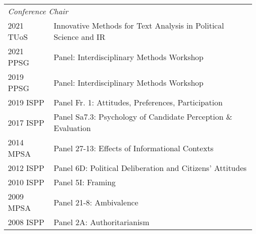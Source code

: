 \documentclass[12pt]{article}
\begin{document}
\begin{longtable}{@{}p{3.5cm}@{}l}%
    \multicolumn{2}{l}{\textit{Conference Chair}}\\

			2021 TUoS & Innovative Methods for Text Analysis in Political Science and IR\\    
    
			2021 PPSG & {Panel: Interdisciplinary Methods Workshop}\\  
			
			 2019 PPSG & {Panel: Interdisciplinary Methods Workshop}\\  
    		
			2019 ISPP & {Panel Fr. 1: Attitudes, Preferences, Participation}\\            
            
            2017 ISPP & {Panel Sa7.3: Psychology of Candidate 
            Perception \& Evaluation}\\    
    
            2014 MPSA & {Panel 27-13: Effects 
            of Informational Contexts}\\
            
            2012 ISPP & {Panel 6D: Political 
            Deliberation and Citizens' Attitudes}\\
            
            2010 ISPP & {Panel 5I: Framing}\\
            
            2009 MPSA & {Panel 21-8: Ambivalence}\\
            
            2008 ISPP & {Panel 2A: Authoritarianism}\\
\end{longtable}
\end{document}

